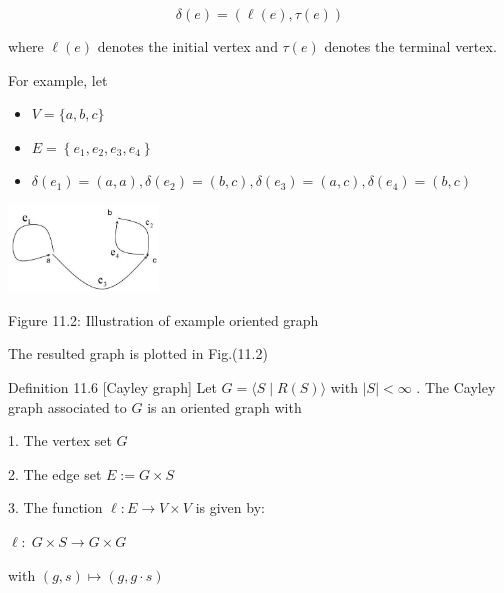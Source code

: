 \[
\delta \left( e\right)  = \left( {\ell \left( e\right) ,\tau \left( e\right) }\right)
\]

where \(\ell \left( e\right)\) denotes the initial vertex and \(\tau \left( e\right)\) denotes the terminal vertex.

For example, let

\begin{itemize}
\item \(V = \{ a,b,c\}\)
\end{itemize}

\begin{itemize}
\item \(E = \left\{  {{e}_{1},{e}_{2},{e}_{3},{e}_{4}}\right\}\)
\end{itemize}

\begin{itemize}
\item \(\delta \left( {e}_{1}\right)  = \left( {a,a}\right) ,\delta \left( {e}_{2}\right)  = \left( {b,c}\right) ,\delta \left( {e}_{3}\right)  = \left( {a,c}\right) ,\delta \left( {e}_{4}\right)  = \left( {b,c}\right)\)
\end{itemize}

\begin{center}
\includegraphics[max width=0.3\textwidth]{images/bo_d2bcsrref24c73avs720_109_740_1525_457_264_0.jpg}
\end{center}
\hspace*{3em} 

Figure 11.2: Illustration of example oriented graph

The resulted graph is plotted in Fig.(11.2)

Definition 11.6 [Cayley graph] Let \(G = \langle S \mid  R\left( S\right) \rangle\) with \(\left| S\right|  < \infty\) . The Cayley graph associated to \(G\) is an oriented graph with

1. The vertex set \(G\)

2. The edge set \(E \mathrel{\text{ := }} G \times  S\)

3. The function \(\ell  : E \rightarrow  V \times  V\) is given by:

\(\ell  : \;G \times  S \rightarrow  G \times  G\)

with \(\left( {g,s}\right)  \mapsto  \left( {g,g \cdot  s}\right)\)

